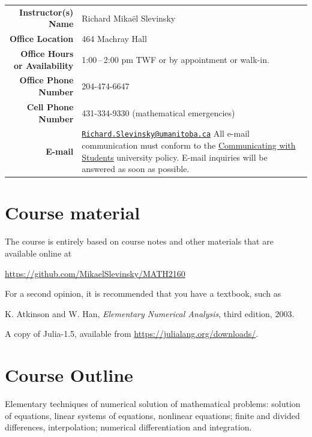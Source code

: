 \documentclass[12pt]{article}
\newlength{\infoTableSpace}
\begin{document}
\noindent
\begin{tabular*}{\linewidth}{r@{\hspace{\infoTableSpace}}l}
	\toprule
	\textbf{Instructor(s) Name} 			& Richard Mika\"el Slevinsky 	\\ 
	\textbf{Office Location}				& 464 Machray Hall	\\
	\textbf{Office Hours or Availability} & 1:00\,--\,2:00 pm TWF or by appointment or walk-in.\\
	\textbf{Office Phone Number} 			& 204-474-6647	\\
	\textbf{Cell Phone Number} 			& 431-334-9330 (mathematical emergencies) \\
	\textbf{E-mail}	& \begin{minipage}[t]{0.65\linewidth}	
			\href{mailto:Richard.Slevinsky@umanitoba.ca}{\texttt{Richard.Slevinsky@umanitoba.ca}}
			All e-mail communication must conform to the 
			\href{http://umanitoba.ca/admin/governance/media/Electronic_Communication_with_Students_Policy_-_2014_06_05.pdf}{Communicating with Students} university policy. E-mail inquiries will be answered as soon as possible.			
		\end{minipage} \\
	\bottomrule
\end{tabular*}


\section{Course material}

The course is entirely based on course notes and other materials that are available online at

\href{https://github.com/MikaelSlevinsky/MATH2160}{https://github.com/MikaelSlevinsky/MATH2160}

For a second opinion, it is recommended that you have a textbook, such as

K. Atkinson and W. Han, {\em Elementary Numerical Analysis}, third edition, 2003.

A copy of {\sc Julia-1.5}, available from \href{https://julialang.org/downloads/}{https://julialang.org/downloads/}.

\section{Course Outline}

Elementary techniques of numerical solution of mathematical problems: solution of equations, linear systems of equations, nonlinear equations; finite and divided differences, interpolation; numerical differentiation and integration.
\end{document}
